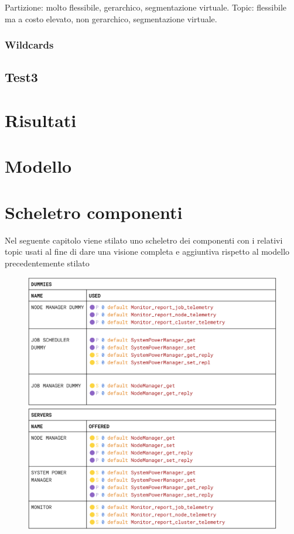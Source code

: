 Partizione: molto flessibile, gerarchico, segmentazione virtuale.
Topic: flessibile ma a costo elevato, non gerarchico, segmentazione virtuale.

\subsubsection{Wildcards}

\subsection{Test3}

\section{Risultati}
\section{Modello}
\section{Scheletro componenti}
Nel seguente capitolo viene stilato uno scheletro dei componenti con i relativi topic usati al fine di dare una visione completa e aggiuntiva rispetto al modello precedentemente stilato  
\begin{figure}[H]
    \centering
    \includegraphics[width=\textwidth]{./img/dummies_skeleton.png}
    \includegraphics[width=\textwidth]{./img/server_skeleton.png}
\end{figure}
